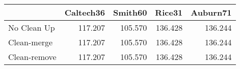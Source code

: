 \begin{tabular}{lrrrr}
\toprule
{} & Caltech36 & Smith60 &  Rice31 & Auburn71 \\
\midrule
No Clean Up  &   117.207 & 105.570 & 136.428 &  136.244 \\
Clean-merge  &   117.207 & 105.570 & 136.428 &  136.244 \\
Clean-remove &   117.207 & 105.570 & 136.428 &  136.244 \\
\bottomrule
\end{tabular}
